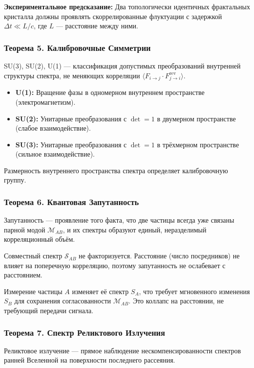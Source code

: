 \documentclass[12pt,a4paper]{article}
\begin{document}
\textbf{Экспериментальное предсказание:} Два топологически идентичных фрактальных кристалла должны проявлять скоррелированные флуктуации с задержкой $\Delta t \ll L/c$, где $L$ --- расстояние между ними.

\subsubsection{Теорема 5. Калибровочные Симметрии}
SU(3), SU(2), U(1) --- классификация допустимых преобразований внутренней структуры спектра, не меняющих корреляции $\langle F_{i \to j} \cdot F_{j \to i}^{\text{rev}} \rangle$.

\begin{itemize}
    \item \textbf{U(1):} Вращение фазы в одномерном внутреннем пространстве (электромагнетизм).
    \item \textbf{SU(2):} Унитарные преобразования с $\det = 1$ в двумерном пространстве (слабое взаимодействие).
    \item \textbf{SU(3):} Унитарные преобразования с $\det = 1$ в трёхмерном пространстве (сильное взаимодействие).
\end{itemize}

Размерность внутреннего пространства спектра определяет калибровочную группу.

\subsubsection{Теорема 6. Квантовая Запутанность}
Запутанность --- проявление того факта, что две частицы всегда уже связаны парной модой $\mathcal{M}_{AB}$, и их спектры образуют единый, неразделимый корреляционный объём.

Совместный спектр $\mathcal{S}_{AB}$ не факторизуется. Расстояние (число посредников) не влияет на поперечную корреляцию, поэтому запутанность не ослабевает с расстоянием.

Измерение частицы $A$ изменяет её спектр $S_A$, что требует мгновенного изменения $S_B$ для сохранения согласованности $\mathcal{M}_{AB}$. Это коллапс на расстоянии, не требующий передачи сигнала.

\subsubsection{Теорема 7. Спектр Реликтового Излучения}
Реликтовое излучение --- прямое наблюдение нескомпенсированности спектров ранней Вселенной на поверхности последнего рассеяния.
\end{document}
